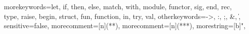 \newcommand{\setlangcoq}{
\lstset{
  language=MyCoq, tabsize=2, frame=single, breaklines=true,
  basicstyle=\ttfamily, framexleftmargin=1mm, xleftmargin=1mm
}
}



  {morekeywords={let, if, then, else, match, with, module,
      functor, sig, end, rec, type, raise, begin, struct, fun, function,
      in, try, val},
    otherkeywords={->, :, ;, \&, \|},
    sensitive=false,
    morecomment=[n]{(*}{*)},   %
    morecomment=[n]{(**}{*)},  %
    morestring=[b]",
  }

\newcommand{\setlangocaml}{
\lstset{
  language=MyOCaml, tabsize=2, frame=single, breaklines=true,
  basicstyle=\ttfamily, framexleftmargin=1mm, xleftmargin=1mm
}
}
